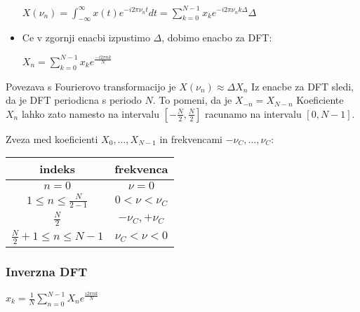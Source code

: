 \documentclass{article}
\begin{document}
\begin{multicols}{2}
\begin{itemize}
		      \begin{center}
			      \begin{math}
				      X(\nu_n) = \int_{-\infty}^{\infty} x(t) e^{-i2 \pi \nu_n t} dt = \sum^{N-1}_{k=0} x_k e^{-i2 \pi \nu_n k \Delta} \Delta
			      \end{math}
		      \end{center}
		\item Ce v zgornji enacbi izpustimo $\Delta$, dobimo enacbo za DFT:
		      \begin{center}
			      \begin{math}
				      X_n = \sum_{k=0}^{N-1} x_k e^{\frac{-i2 \pi n k}{N}}
			      \end{math}
		      \end{center}
	\end{itemize}

	Povezava s Fourierovo transformacijo je $X(\nu_n) \approx \Delta X_n$
	Iz enacbe za DFT sledi, da je DFT periodicna s periodo $N$. To pomeni, da je $X_{-n} = X_{N-n}$
	Koeficiente $X_n$ lahko zato namesto na intervalu $[-\frac{N}{2}, \frac{N}{2}]$ racunamo na
	intervalu $[0, N - 1]$.

	Zveza med koeficienti $X_0, \dots, X_{N-1}$ in frekvencami $- \nu_C, \dots, \nu_C$:
	\begin{center}
		\begin{tabular}{ cc }
			indeks                              & frekvenca         \\
			\hline
			$n = 0$                             & $\nu = 0$         \\
			$1 \leq n \leq \frac{N}{2-1}$       & $0 < \nu < \nu_C$ \\
			$\frac{N}{2}$                       & $-\nu_C, + \nu_C$ \\
			$\frac{N}{2} + 1 \leq n \leq N - 1$ & $\nu_C < \nu < 0$ \\
			\hline
		\end{tabular}
	\end{center}

	\subsubsection{Inverzna DFT}
	\begin{center}
		\begin{math}
			x_k = \frac{1}{N} \sum_{n=0}^{N-1} X_{n}e^{\frac{i2 \pi n k}{N}}
		\end{math}
	\end{center}


\end{multicols}
\end{document}
